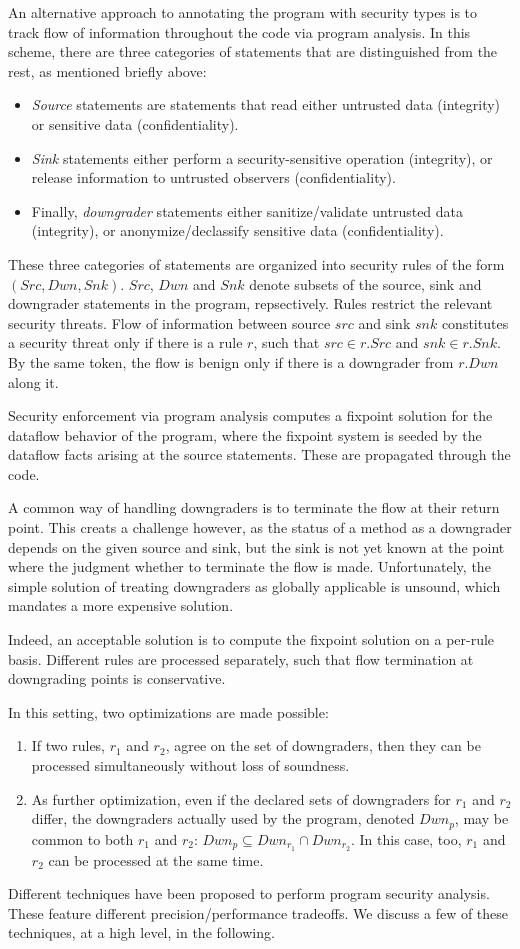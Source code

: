 An alternative approach to annotating the program with security types is to track flow of information throughout the code via program analysis. In this scheme, there are three categories of statements that are distinguished from the rest, as mentioned briefly above:
\begin{itemize}
	\item \emph{Source} statements are statements that read either untrusted data (integrity) or sensitive data (confidentiality).
	\item \emph{Sink} statements either perform a security-sensitive operation (integrity), or release information to untrusted observers (confidentiality).
	\item Finally, \emph{downgrader} statements either sanitize/validate untrusted data (integrity), or anonymize/declassify sensitive data (confidentiality).
\end{itemize}

These three categories of statements are organized into security rules of the form $\left( Src,Dwn,Snk \right)$. $Src$, $Dwn$ and $Snk$ denote subsets of the source, sink and downgrader statements in the program, repsectively. Rules restrict the relevant security threats. Flow of information between source $src$ and sink $snk$ constitutes a security threat only if there is a rule $r$, such that $src \in r.Src$ and $snk \in r.Snk$. By the same token, the flow is benign only if there is a downgrader from $r.Dwn$ along it. 

Security enforcement via program analysis computes a fixpoint solution for the dataflow behavior of the program, where the fixpoint system is seeded by the dataflow facts arising at the source statements. These are propagated through the code.

A common way of handling downgraders is to terminate the flow at their return point. This creats a challenge however, as the status of a method as a downgrader depends on the given source and sink, but the sink is not yet known at the point where the judgment whether to terminate the flow is made. Unfortunately, the simple solution of treating downgraders as globally applicable is unsound, which mandates a more expensive solution.

Indeed, an acceptable solution is to compute the fixpoint solution on a per-rule basis. Different rules are processed separately, such that flow termination at downgrading points is conservative. 

In this setting, two optimizations are made possible:
\begin{enumerate}
	\item If two rules, $r_1$ and $r_2$, agree on the set of downgraders, then they can be processed simultaneously without loss of soundness.
	\item As further optimization, even if the declared sets of downgraders for $r_1$ and $r_2$ differ, the downgraders actually used by the program, denoted $Dwn_p$, may be common to both $r_1$ and $r_2$: $Dwn_p \subseteq Dwn_{r_1} \cap Dwn_{r_2}$. In this case, too, $r_1$ and $r_2$ can be processed at the same time.
\end{enumerate}

Different techniques have been proposed to perform program security analysis. These feature different precision/performance tradeoffs. We discuss a few of these techniques, at a high level, in the following.